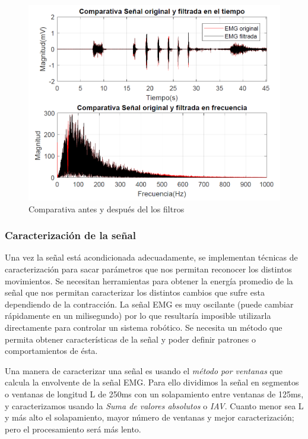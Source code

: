 \begin{figure}[H]
	\center
	\includegraphics[scale=0.5]{imagenes/Disenodelsistema/graf4.png}
	\caption{Comparativa antes y después del los filtros}
	\label{fig:graf4}
\end{figure}

\subsubsection{Caracterización de la señal}

Una vez la señal está acondicionada adecuadamente, se implementan técnicas de caracterización para sacar parámetros que nos permitan reconocer los distintos movimientos. Se necesitan herramientas para obtener la energía promedio de la señal que nos permitan caracterizar los distintos cambios que sufre esta dependiendo de la contracción.
La señal EMG es muy oscilante (puede cambiar rápidamente en un milisegundo) por lo que resultaría imposible utilizarla directamente para controlar un sistema robótico. Se necesita un método que permita obtener características de la señal y poder definir patrones o comportamientos de ésta. \newline

Una manera de caracterizar una señal es usando el \textit{método por ventanas} que calcula la envolvente de la señal EMG. Para ello dividimos la señal en segmentos o ventanas de longitud L de 250ms con un solapamiento entre ventanas de 125ms, y caracterizamos usando la \textit{Suma de valores absolutos} o \textit{IAV}. Cuanto menor sea L y más alto el solapamiento, mayor número de ventanas y mejor caracterización; pero el procesamiento será más lento. \newline

